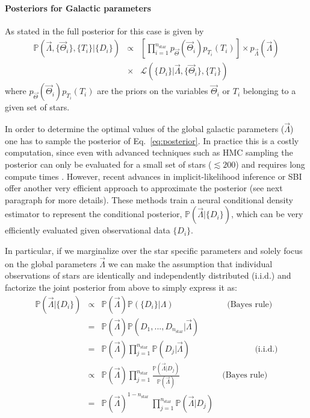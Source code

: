 \documentclass{aa}
\begin{document}
\paragraph{Posteriors for Galactic parameters}
As stated in \citet{Philcox_2019} the full posterior for this case is given by 
\begin{eqnarray}\label{eq:posterior}
    \mathbb{P}(\vec\Lambda,\{\vec\Theta_i\},\{T_i\}|\{D_i\}) &\propto&  \left[\prod_{i=1}^{n_\mathrm{star}}p_{\vec\Theta}(\vec\Theta_i)p_{T_i}(T_i)\right]
    \times p_{\vec\Lambda}(\vec\Lambda)\\
    \nonumber
    &\times& \mathcal{L}(\{D_i\}|\vec\Lambda,\{\vec\Theta_i\},\{T_i\})
\end{eqnarray}
where $p_{\vec\Theta}(\vec\Theta_i)p_{T_i}(T_i)$ are the priors on the variables $\vec\Theta_i$ or $T_i$ belonging to a given set of stars.

In order to determine the optimal values of the global galactic parameters ($\Vec{\Lambda}$) one has to sample the posterior of Eq.~\ref{eq:posterior}. In practice this is a costly computation, since even with advanced techniques such as HMC sampling the posterior can only be evaluated for a small set of stars ($\lesssim200$) and requires long compute times \citep[$\sim42$ hours][]{Philcox_2019}.
%
However, recent advances in implicit-likelihood inference or SBI \citep{Cranmer2020} offer another very efficient approach to approximate the posterior (see next paragraph for more details). These methods train a neural conditional density estimator to represent the conditional posterior, $\mathbb{P}(\vec\Lambda|\{D_i\})$, which can be very efficiently evaluated given observational data $\{D_i\}$.

In particular, if we marginalize over the star specific parameters and solely focus on the global parameters $\Vec{\Lambda}$ we can make the assumption that individual observations of stars are identically and independently distributed (i.i.d.) and factorize the joint posterior from above to simply express it as:  %
\begin{eqnarray}
\mathbb{P}(\vec\Lambda|\{D_i\}) &\propto& 
\mathbb{P}(\vec\Lambda)\mathbb{P}(\{D_i\}|\Lambda)\quad\quad\quad\quad\quad\quad\,\, \text{(Bayes rule)}
\\\nonumber
&=&
\mathbb{P}(\vec\Lambda)\mathbb{P}
(D_1,...,D_{n_\mathrm{star}}|\vec\Lambda)
\\\nonumber
&=& \mathbb{P}(\vec\Lambda)\prod_{j=1}^{n_\mathrm{star}}\mathbb{P}(D_j|\vec\Lambda) \quad\quad\quad\quad\quad\quad\quad\,\,\,\, \text{(i.i.d.)}
\\\nonumber
&\propto& \mathbb{P}(\vec\Lambda) \prod_{j=1}^{n_\mathrm{star}}\frac{\mathbb{P}(\vec\Lambda|D_j)}{\mathbb{P}(\vec\Lambda)} \quad\quad\quad\quad\quad\text{(Bayes rule)}
\\%
\label{eq:posterior}
&=& \mathbb{P}(\vec\Lambda)^{1-n_\mathrm{star}}\ \prod_{j=1}^{n_\mathrm{star}}\mathbb{P}(\vec\Lambda|D_j) 
\end{eqnarray}
\end{document}
